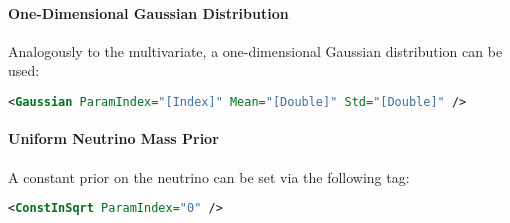 \paragraph{One-Dimensional Gaussian Distribution}
Analogously to the multivariate, a one-dimensional Gaussian distribution can be used:
\begin{lstlisting}[language=XML]
<Gaussian ParamIndex="[Index]" Mean="[Double]" Std="[Double]" />
\end{lstlisting}

\paragraph{Uniform Neutrino Mass Prior}
A constant prior on the neutrino can be set via the following tag:
\begin{lstlisting}[language=XML]
<ConstInSqrt ParamIndex="0" />
\end{lstlisting}